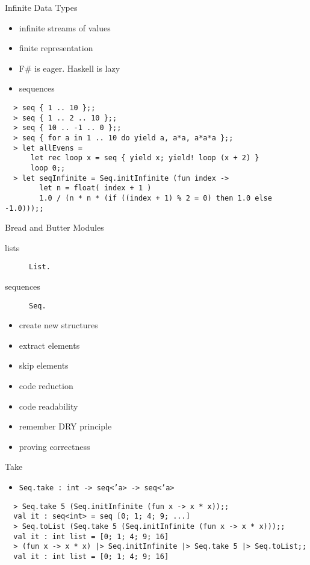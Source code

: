 \documentclass{beamer}
\begin{document}
\begin{frame}[fragile]{Infinite Data Types}
  \begin{itemize}[<+->]
    \item infinite streams of values
    \item finite representation
    \item F\# is eager. Haskell is lazy
    \item sequences
  \end{itemize}
  \pause
  \tiny
  \begin{verbatim}
  > seq { 1 .. 10 };;
  > seq { 1 .. 2 .. 10 };;
  > seq { 10 .. -1 .. 0 };;
  > seq { for a in 1 .. 10 do yield a, a*a, a*a*a };;
  > let allEvens =
      let rec loop x = seq { yield x; yield! loop (x + 2) }
      loop 0;;
  > let seqInfinite = Seq.initInfinite (fun index ->
        let n = float( index + 1 )
        1.0 / (n * n * (if ((index + 1) % 2 = 0) then 1.0 else -1.0)));;
  \end{verbatim}
\end{frame}

\begin{frame}{Bread and Butter Modules}
  \begin{description}
    \item[lists] \texttt{List.}
    \item[sequences] \texttt{Seq.}
  \end{description}
  \pause
  \begin{itemize}
    \item create new structures
    \item extract elements
    \item skip elements
    \item code reduction
    \item code readability
    \item remember DRY principle
    \item proving correctness
  \end{itemize}
\end{frame}

\begin{frame}[fragile]{Take}
  \begin{itemize}
    \item \texttt{Seq.take : int -> seq<'a> -> seq<'a>}
  \end{itemize}
  \tiny
  \begin{verbatim}
  > Seq.take 5 (Seq.initInfinite (fun x -> x * x));;
  val it : seq<int> = seq [0; 1; 4; 9; ...]
  > Seq.toList (Seq.take 5 (Seq.initInfinite (fun x -> x * x)));;
  val it : int list = [0; 1; 4; 9; 16]
  > (fun x -> x * x) |> Seq.initInfinite |> Seq.take 5 |> Seq.toList;;
  val it : int list = [0; 1; 4; 9; 16]
  \end{verbatim}
\end{frame}
\end{document}
